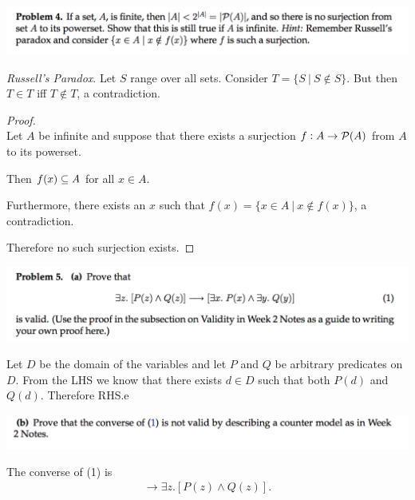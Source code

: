 \documentclass[12pt]{article}
\begin{document}
\begin{mdframed}
\includegraphics[width=400pt]{img/MIT-math-for-cs-2005-set-1-4.png}
\end{mdframed}


\begin{mdframed}
  {\it Russell's Paradox}. Let $S$ range over all sets. Consider $T = \{S~|~S \not \in S\}$. But
  then $T \in T$ iff $T \not \in T$, a contradiction.
\end{mdframed}

\begin{proof}~\\
  Let $A$ be infinite and suppose that there exists a surjection $f:A \to \mathcal P(A)$ from $A$ to its
  powerset.

  Then $f(x) \subseteq A$ for all $x \in A$.

  Furthermore, there exists an $x$ such that $f(x) = \{x \in A ~|~ x \notin f(x)\}$, a
  contradiction.

  Therefore no such surjection exists.
\end{proof}

\begin{mdframed}
\includegraphics[width=400pt]{img/MIT-math-for-cs-2005-set-1-5.png}
\end{mdframed}
Let $D$ be the domain of the variables and let $P$ and $Q$ be arbitrary predicates on $D$. From the
LHS we know that there exists $d \in D$ such that both $P(d)$ and $Q(d)$. Therefore RHS.e

\begin{mdframed}
\includegraphics[width=400pt]{img/MIT-math-for-cs-2005-set-1-5-b.png}
\end{mdframed}
The converse of (1) is
\begin{align*}
  [\exists x. P(x) \land \exists y. Q(y)] \rightarrow \exists z. [P(z) \land Q(z)].
\end{align*}
\end{document}
